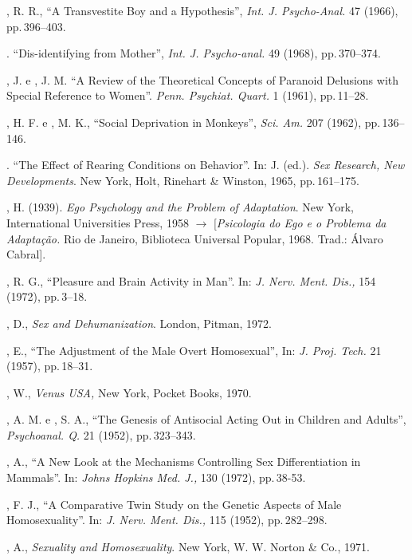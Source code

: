 \begin{description}
, R. R., ``A Transvestite Boy and a
Hypothesis'', \textit{Int. J. Psycho-Anal. } 47 (1966), pp.\,396--403.

. ``Dis-identifying from Mother'',
\textit{ Int. J. Psycho-anal. } 49 (1968), pp.\,370--374.

, J. e , J. M. ``A Review of the Theoretical
Concepts of Paranoid Delusions with Special Reference to Women''.
\textit{ Penn. Psychiat. Quart. } 1 (1961), pp.\,11--28.

, H. F. e , M. K., ``Social Deprivation in
Monkeys'', \textit{Sci. Am. } 207 (1962), pp.\,136--146.

. ``The Effect of Rearing Conditions on
Behavior''. In:  J. (ed.). \textit{Sex Research, 
New Developments}. New York, Holt, Rinehart \& Winston, 1965, pp.\,161--175.

, H. (1939). \textit{Ego Psychology and the Problem of Adaptation}. New
York, International Universities Press, 1958 {$\bm{\rightarrow}$} [\textit{Psicologia do Ego e o
Problema da Adaptação. }Rio de Janeiro, Biblioteca Universal Popular, 1968. Trad.:
Álvaro Cabral].

, R. G., ``Pleasure and Brain Activity in Man''. In: 
\textit{J. Nerv. Ment. Dis., } 154 (1972), pp.\,3--18.

, D., \textit{Sex and Dehumanization}. London, Pitman, 1972.

, E., ``The Adjustment of the Male Overt
Homosexual'', In: \textit{ J. Proj. Tech. }21 (1957), pp.\,18--31.

, W., \textit{Venus USA, }New York, Pocket Books, 1970.

, A. M. e , S. A., ``The Genesis of Antisocial Acting
Out in Children and Adults'', \textit{Psychoanal. Q. }21 (1952), pp.\,323--343.

, A., ``A New Look at the Mechanisms Controlling Sex
Differentiation in Mammals''. In: \textit{Johns Hopkins Med. J., }130
(1972), pp.\,38-53.

, F. J., ``A Comparative Twin Study on the Genetic Aspects
of Male Homosexuality''. In: \textit{J. Nerv. Ment. Dis., }115 (1952),
pp.\,282--298.

, A., \textit{Sexuality and Homosexuality}. New York, W. W. Norton \&
Co., 1971.


\end{description}
